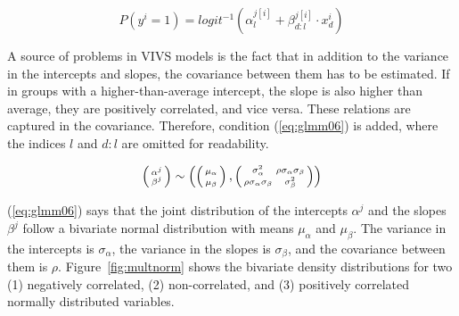 \documentclass[a4paper,12pt]{article}
\begin{document}
\begin{equation}
  P(y^i=1)=logit^{-1}(\alpha_{l}^{j[i]}+\beta_{d:l}^{j[i]}\cdot x_d^i)
  \label{eq:glmm05}
\end{equation}

A source of problems in VIVS models is the fact that in addition to the variance in the intercepts and slopes, the covariance between them has to be estimated.
If in groups with a higher-than-average intercept, the slope is also higher than average, they are positively correlated, and vice versa.
These relations are captured in the covariance.
Therefore, condition (\ref{eq:glmm06}) is added, where the indices $l$ and $d:l$ are omitted for readability.

\begin{equation} 
  \left( \begin{smallmatrix} \alpha^j \\ \beta^j \end{smallmatrix}\right) \sim
    \left(
    \left( \begin{smallmatrix} \mu_{\alpha}\vphantom{\beta^j} \\ \mu_{\beta}\vphantom{\beta^j} \end{smallmatrix} \right), 
      \left( \begin{smallmatrix} \sigma_{\alpha}^2 & \rho\sigma_{\alpha}\sigma_{\beta} \\
	\rho\sigma_{\alpha}\sigma_{\beta} & \sigma_{\beta}^2 \end{smallmatrix} \right)
    \right)
  \label{eq:glmm06}
\end{equation}

(\ref{eq:glmm06}) says that the joint distribution of the intercepts $\alpha^j$ and the slopes $\beta^j$ follow a bivariate normal distribution with means $\mu_{\alpha}$ and $\mu_{\beta}$.
The variance in the intercepts is $\sigma_{\alpha}$, the variance in the slopes is $\sigma_{\beta}$, and the covariance between them is $\rho$.
Figure~\ref{fig:multnorm} shows the bivariate density distributions for two (1) negatively correlated, (2) non-correlated, and (3) positively correlated normally distributed variables.
\end{document}
